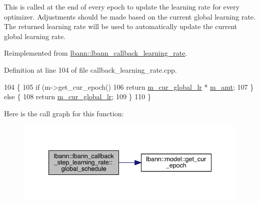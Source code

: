 This is called at the end of every epoch to update the learning rate for every optimizer. Adjustments should be made based on the current global learning rate. The returned learning rate will be used to automatically update the current global learning rate. 

Reimplemented from \hyperlink{classlbann_1_1lbann__callback__learning__rate_a7869b93e5963d6f76da68d8c8137b979}{lbann\+::lbann\+\_\+callback\+\_\+learning\+\_\+rate}.



Definition at line 104 of file callback\+\_\+learning\+\_\+rate.\+cpp.


\begin{DoxyCode}
104                                                                  \{
105   \textcolor{keywordflow}{if} (m->get\_cur\_epoch() %
106     \textcolor{keywordflow}{return} \hyperlink{classlbann_1_1lbann__callback__learning__rate_a97194f282c29a748c915d9811a8a99fb}{m\_cur\_global\_lr} * \hyperlink{classlbann_1_1lbann__callback__step__learning__rate_ab6f5430cf862ec67392dc0f69ced81e6}{m\_amt};
107   \} \textcolor{keywordflow}{else} \{
108     \textcolor{keywordflow}{return} \hyperlink{classlbann_1_1lbann__callback__learning__rate_a97194f282c29a748c915d9811a8a99fb}{m\_cur\_global\_lr};
109   \}
110 \}
\end{DoxyCode}
Here is the call graph for this function\+:\nopagebreak
\begin{figure}[H]
\begin{center}
\leavevmode
\includegraphics[width=340pt]{classlbann_1_1lbann__callback__step__learning__rate_a440671682e8c041a7208af77231059ec_cgraph}
\end{center}
\end{figure}
\mbox{\label{classlbann_1_1lbann__callback__step__learning__rate_a0332449e3d03aac46e0562cede85a5ed}} 
